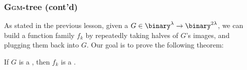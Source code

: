 
\subsubsection{\textsc{Ggm}-tree (cont'd)}

As stated in the previous lesson, given a \prg{} $G \in \binary^\lambda \to \binary^{2\lambda}$, we can build a function family $f_k$ by repeatedly taking halves of $G$'s images, and plugging them back into $G$. Our goal is to prove the following theorem:

\begin{theorem}
    If $G$ is a \prg, then $f_k$ is a \prf.
\end{theorem}

